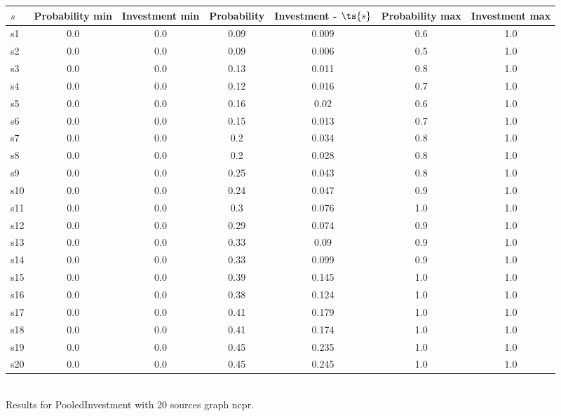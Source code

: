 \documentclass{article}
\begin{document}
\noindent\begin{tabular}{|l|c|c|c|c|c|c|}
\hline
$s$& Probability min & Investment min & Probability & Investment - $\ts{s}$ & Probability max & Investment max\\
\hline
s1 &0.0 & 0.0 & 0.09 & 0.009 & 0.6 & 1.0\\
\hline
s2 &0.0 & 0.0 & 0.09 & 0.006 & 0.5 & 1.0\\
\hline
s3 &0.0 & 0.0 & 0.13 & 0.011 & 0.8 & 1.0\\
\hline
s4 &0.0 & 0.0 & 0.12 & 0.016 & 0.7 & 1.0\\
\hline
s5 &0.0 & 0.0 & 0.16 & 0.02 & 0.6 & 1.0\\
\hline
s6 &0.0 & 0.0 & 0.15 & 0.013 & 0.7 & 1.0\\
\hline
s7 &0.0 & 0.0 & 0.2 & 0.034 & 0.8 & 1.0\\
\hline
s8 &0.0 & 0.0 & 0.2 & 0.028 & 0.8 & 1.0\\
\hline
s9 &0.0 & 0.0 & 0.25 & 0.043 & 0.8 & 1.0\\
\hline
s10 &0.0 & 0.0 & 0.24 & 0.047 & 0.9 & 1.0\\
\hline
s11 &0.0 & 0.0 & 0.3 & 0.076 & 1.0 & 1.0\\
\hline
s12 &0.0 & 0.0 & 0.29 & 0.074 & 0.9 & 1.0\\
\hline
s13 &0.0 & 0.0 & 0.33 & 0.09 & 0.9 & 1.0\\
\hline
s14 &0.0 & 0.0 & 0.33 & 0.099 & 0.9 & 1.0\\
\hline
s15 &0.0 & 0.0 & 0.39 & 0.145 & 1.0 & 1.0\\
\hline
s16 &0.0 & 0.0 & 0.38 & 0.124 & 1.0 & 1.0\\
\hline
s17 &0.0 & 0.0 & 0.41 & 0.179 & 1.0 & 1.0\\
\hline
s18 &0.0 & 0.0 & 0.41 & 0.174 & 1.0 & 1.0\\
\hline
s19 &0.0 & 0.0 & 0.45 & 0.235 & 1.0 & 1.0\\
\hline
s20 &0.0 & 0.0 & 0.45 & 0.245 & 1.0 & 1.0\\
\hline
\end{tabular}\\

\noindent Results for PooledInvestment with 20 sources graph ncpr.
\end{document}
